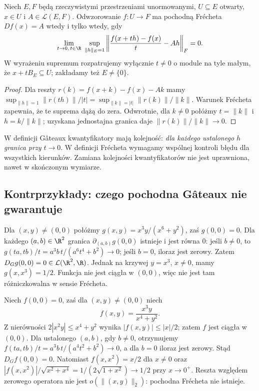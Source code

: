 \begin{stwierdzenie}
\label{prop:uniform-directions14}
Niech $E,F$ będą rzeczywistymi przestrzeniami unormowanymi, $U\subseteq E$ otwarty, $x\in U$ i $A\in\mathcal L(E,F)$. Odwzorowanie $f:U\to F$ ma pochodną Frécheta $Df(x)=A$ wtedy i tylko wtedy, gdy
\[
\lim_{t\to0,\,t\in\R}\ \sup_{\|h\|_E=1}
\left\|\frac{f(x+th)-f(x)}{t}-Ah\right\|_F=0.
\]
W wyrażeniu supremum rozpatrujemy wyłącznie $t\ne0$ o module na tyle małym, że $x+tB_E\subseteq U$; zakładamy też $E\ne\{0\}$.
\end{stwierdzenie}
\begin{proof}
Dla reszty $r(k)=f(x+k)-f(x)-Ak$ mamy
$\sup_{\|h\|=1}\|r(th)\|/|t|=\sup_{\|k\|=|t|}\|r(k)\|/\|k\|$.
Warunek Frécheta zapewnia, że te suprema dążą do zera. Odwrotnie, dla $k\ne0$ połóżmy $t=\|k\|$ i $h=k/\|k\|$; uzyskana jednostajna granica daje $\|r(k)\|/\|k\|\to0$.
\end{proof}

\begin{uwaga}
\label{rem:quantifiers14}
W definicji Gâteaux kwantyfikatory mają kolejność: \emph{dla każdego ustalonego $h$ granica przy $t\to0$}. W definicji Frécheta wymagamy wspólnej kontroli błędu dla wszystkich kierunków. Zamiana kolejności kwantyfikatorów nie jest uprawniona, nawet w skończonym wymiarze.
\end{uwaga}

\subsection{Kontrprzykłady: czego pochodna Gâteaux nie gwarantuje}

\begin{przyklad}
\label{ex:directional-discontinuous14}
Dla $(x,y)\ne(0,0)$ połóżmy
$g(x,y)=x^3y/(x^6+y^2)$, zaś $g(0,0)=0$. Dla każdego $(a,b)\in\R^2$ granica $\partial_{(a,b)}g(0,0)$ istnieje i jest równa $0$: jeśli $b\ne0$, to $g(ta,tb)/t=a^3b\,t/(a^6t^4+b^2)\to0$; jeśli $b=0$, iloraz jest zerowy. Zatem $D_Gg(0,0)=0\in\mathcal L(\R^2,\R)$. Jednak na krzywej $y=x^3$, $x\ne0$, mamy $g(x,x^3)=1/2$. Funkcja nie jest ciągła w $(0,0)$, więc nie jest tam różniczkowalna w sensie Frécheta.
\end{przyklad}

\begin{przyklad}
\label{ex:continuous-gateaux-not-frechet14}
Niech $f(0,0)=0$, zaś dla $(x,y)\ne(0,0)$ niech
\[
f(x,y)=\frac{x^3y}{x^4+y^2}.
\]
Z nierówności $2|x^2y|\le x^4+y^2$ wynika $|f(x,y)|\le|x|/2$; zatem $f$ jest ciągła w $(0,0)$. Dla ustalonego $(a,b)$, gdy $b\ne0$, otrzymujemy
$f(ta,tb)/t=a^3b\,t/(a^4t^2+b^2)\to0$, a dla $b=0$ iloraz jest zerowy. Stąd $D_Gf(0,0)=0$. Natomiast $f(x,x^2)=x/2$ dla $x\ne0$ oraz
$|f(x,x^2)|/\sqrt{x^2+x^4}=1/(2\sqrt{1+x^2})\to1/2$ przy $x\to0^+$. Reszta względem zerowego operatora nie jest $o(\|(x,y)\|_2)$: pochodna Frécheta nie istnieje.
\end{przyklad}

